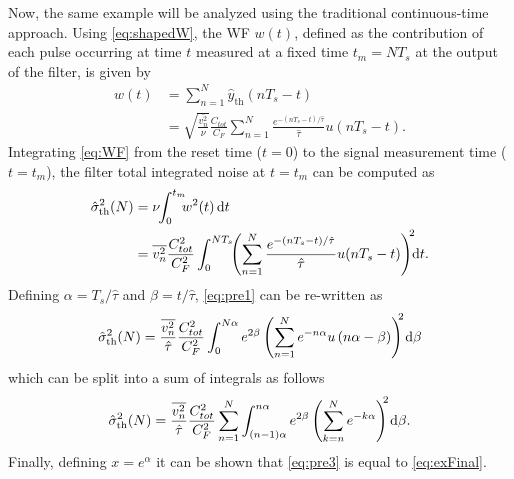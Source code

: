 Now, the same example will be analyzed using the traditional \mbox{continuous-time} approach. Using \eqref{eq:shapedW}, the WF $w(t)$, defined as the contribution of each pulse occurring at time $t$ measured at a fixed time $t_m=NT_s$ at the output of the filter, is given by
\begin{align}
	w(t) &= \sum_{n=1}^{N} \hat{y}_\text{th}(nT_s-t) \nonumber \\
       	 &=\sqrt{\frac{\overline{v_n^2}}{\nu}} \frac{C_{tot}}{C_F}\sum_{n=1}^{N} \frac{e^{-(nT_s-t)/\hat{\tau}}}{\hat{\tau}} u(nT_s-t) \label{eq:WF}.
\end{align}
Integrating \eqref{eq:WF} from the reset time ($t=0$) to the signal measurement time ($t=t_m$), the filter total integrated noise at $t=t_m$ can be computed as
\begin{align} 
	\hat{\sigma}_\text{th}^2(N) &= \nu \hspace{-0.3em}\int_{0}^{t_m}\hspace{-0.5em}w^2(t)\,\text{d}t \nonumber \\
									&= \overline{v_n^2} \frac{C_{tot}^2}{C_F^2} \int_{0}^{NT_s} \hspace{-0.4em}\left(\sum_{n=1}^{N} \frac{e^{-(nT_s-t)/\hat{\tau}}}{\hat{\tau}} u(nT_s-t)\right)^{\hspace{-0.2em}2}\hspace{-0.4em}\text{d}t \label{eq:pre1}.
\end{align}
Defining $\alpha = T_s/\hat{\tau}$ and $\beta = t/\hat{\tau}$, \eqref{eq:pre1} can be \mbox{re-written} as
\begin{equation}
	\hat{\sigma}_\text{th}^2(N)   = \frac{\overline{v_n^2}}{\hat{\tau}}\frac{C_{tot}^2}{C_F^2}\int_{0}^{N\alpha}e^{2\beta} \left(\sum_{n=1}^{N}e^{-n\alpha}u\left(n\alpha-\beta\right) \right)^{\hspace{-0.3em}2}\hspace{-0.1em}\text{d}\beta \label{eq:pre2}
\end{equation}
which can be split into a sum of integrals as follows
\begin{equation}
	\hat{\sigma}_\text{th}^2(N) = \frac{\overline{v_n^2}}{\hat{\tau}}\frac{C_{tot}^2}{C_F^2}\sum_{n=1}^{N}\int_{(n-1)\alpha}^{n \alpha} e^{2\beta} \left(\sum_{k = n}^{N} e^{-k\alpha}\right)^{\hspace{-0.3em}2}\hspace{-0.1em}\text{d}\beta \label{eq:pre3}.
\end{equation}
Finally, defining $x= e^{\alpha}$ it can be shown that \eqref{eq:pre3} is equal to \eqref{eq:exFinal}.

